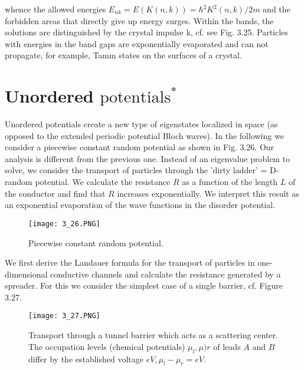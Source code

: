 whence the allowed energies $E_{nk} = E (K (n, k)) = \hbar^2K^2 (n, k) / 2m$ and the forbidden areas that directly give up energy surges. Within the bands, the solutions are distinguished by the crystal impulse k, cf. see Fig. 3.25. Particles with energies in the band gaps are exponentially evaporated and can not propagate, for example, Tamm states on the surfaces of a crystal.
\section{Unordered $\text{potentials}^*$}
Unordered potentials create a new type of eigenstates localized in space (as opposed to the extended periodic potential Bloch waves). In the following we consider a piecewise constant random potential as shown in Fig. 3.26. Our analysis is different from the previous one. Instead of an eigenvalue problem to solve, we consider the transport of particles through the 'dirty ladder' = D-random potential. We calculate the resistance $R$ as a function of the length $L$ of the conductor and find that $R$ increases exponentially. We interpret this result as an exponential evaporation of the wave functions in the disorder potential.
\begin{figure}[ht]
    \begin{minipage}{0.5\textwidth}
        \centering
        \texttt{[image: 3\_26.PNG]}
    \end{minipage}
    \begin{minipage}{0.5\textwidth}
        \caption{Piecewise constant random potential.}
    \end{minipage}
\end{figure}
We first derive the Landauer formula for the transport of particles in one-dimensional conductive channels and calculate the resistance generated by a spreader. For this we consider the simplest case of a single barrier, cf. Figure 3.27.
\begin{figure}[ht]
    \begin{minipage}{0.5\textwidth}
        \centering
        \texttt{[image: 3\_27.PNG]}
    \end{minipage}
    \begin{minipage}{0.5\textwidth}
        \caption{Transport through a tunnel barrier which acts as a scattering center. The occupation levels (chemical potentials) $\mu_l,\mu)r$ of leads $A$ and $B$ differ by the established voltage $eV, \mu_l-\mu_r = eV$.}
    \end{minipage}
\end{figure}

